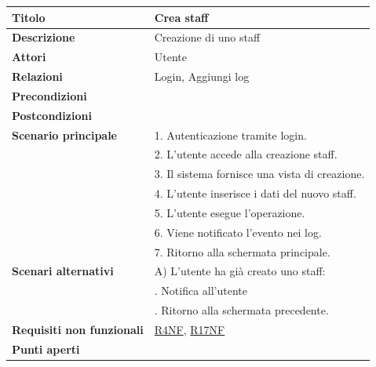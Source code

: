\documentclass[a4paper]{article}
\begin{document}
  \begin{center}
    \begin{tabularx}{1\textwidth}{l|X}
        \textbf{Titolo} & Crea staff \\
        \hline
        \textbf{Descrizione} & Creazione di uno staff \\
        \hline
        \textbf{Attori} & Utente \\
        \hline
        \textbf{Relazioni} & Login, Aggiungi log \\
        \hline
        \textbf{Precondizioni} &  \\
        \hline
        \textbf{Postcondizioni} &  \\
        \hline
        \textbf{Scenario principale} & 1. Autenticazione tramite login. \\
                                     & 2. L'utente accede alla creazione staff. \\
                                     & 3. Il sistema fornisce una vista di creazione. \\
                                     & 4. L'utente inserisce i dati del nuovo staff. \\
                                     & 5. L'utente esegue l'operazione.\\
                                     & 6. Viene notificato l'evento nei log.\\
                                     & 7. Ritorno alla schermata principale.\\
        \hline
        \textbf{Scenari alternativi} & A) L'utente ha già creato uno staff: \\
                                     & \quad 1. Notifica all'utente \\
                                     & \quad 2. Ritorno alla schermata precedente.\\
        \hline
        \textbf{Requisiti non funzionali} & \hyperlink{R4NF}{R4NF}, \hyperlink{R17NF}{R17NF} \\
        \hline
        \textbf{Punti aperti} & \\
        \hline
    \end{tabularx}
  \end{center}


\end{document}
